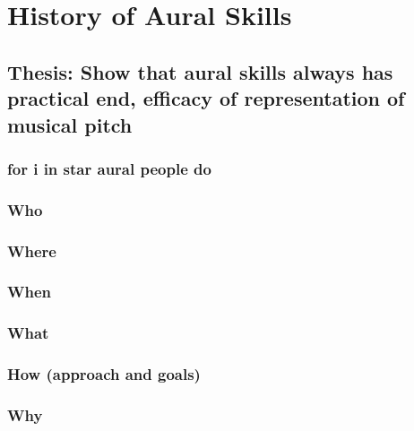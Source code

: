 \documentclass[]{book}
\theoremstyle{definition}
\theoremstyle{definition}
\theoremstyle{definition}
\theoremstyle{remark}
\begin{document}
\hypertarget{history-of-aural-skills}{%
\chapter{History of Aural Skills}\label{history-of-aural-skills}}

\hypertarget{thesis-show-that-aural-skills-always-has-practical-end-efficacy-of-representation-of-musical-pitch}{%
\section{Thesis: Show that aural skills always has practical end,
efficacy of representation of musical
pitch}\label{thesis-show-that-aural-skills-always-has-practical-end-efficacy-of-representation-of-musical-pitch}}

\hypertarget{for-i-in-star-aural-people-do}{%
\subsection{for i in star aural people
do}\label{for-i-in-star-aural-people-do}}

\hypertarget{who}{%
\subsection{Who}\label{who}}

\hypertarget{where}{%
\subsection{Where}\label{where}}

\hypertarget{when}{%
\subsection{When}\label{when}}

\hypertarget{what}{%
\subsection{What}\label{what}}

\hypertarget{how-approach-and-goals}{%
\subsection{How (approach and goals)}\label{how-approach-and-goals}}

\hypertarget{why}{%
\subsection{Why}\label{why}}
\end{document}
